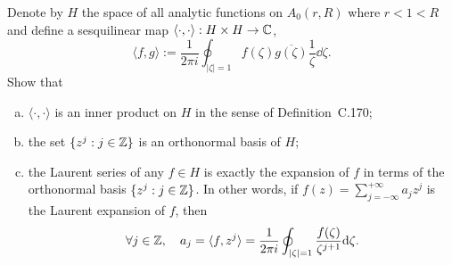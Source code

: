 \documentclass{article}
\begin{document}
Denote by $H$ the space of all analytic functions on $A_0(r, R)$ where
$r < 1 < R$ and define a sesquilinear map $\langle\cdot, \cdot\rangle :
H \times H \to \mathbb{C}$,
\[
  \langle f, g \rangle := \frac{1}{2\pi i}
  \oint_{|\zeta| = 1} f(\zeta) \overline{g(\zeta)} \frac{1}{\zeta} \dd\zeta.
\]
Show that
\begin{enumerate}[(a)]
  \item $\langle\cdot, \cdot\rangle$ is an inner product on $H$ in the sense
    of Definition~C.170;
  \item the set $\{z^j : j \in \mathbb{Z}\}$ is an orthonormal basis of $H$;
  \item the Laurent series of any $f \in H$ is exactly the expansion of $f$ in
    terms of the orthonormal basis $\{z^j : j \in \mathbb{Z}\}$. In other words, if
    $f(z) = \sum_{j=-\infty}^{+\infty} a_j z^j$ is the Laurent expansion of
    $f$, then
    \[
      \forall j \in \mathbb{Z}, \quad a_j = \langle f, z^j \rangle
      = \frac{1}{2\pi i} \oint_{|\zeta|=1} \frac{f(\zeta)}{\zeta^{j+1}} \mathrm{d}\zeta.
    \]
\end{enumerate}
\end{document}

